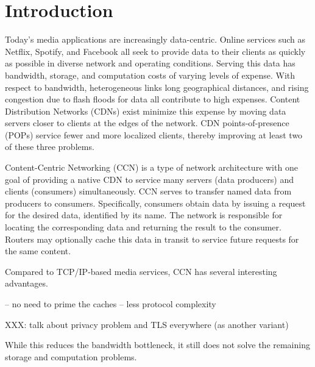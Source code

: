 \section{Introduction}
Today's media applications are increasingly data-centric. Online services
such as Netflix, Spotify, and Facebook all seek to provide data to their
clients as quickly as possible in diverse network and operating conditions. 
Serving this data has bandwidth, storage, and computation costs of varying
levels of expense. With respect to bandwidth, heterogeneous links long geographical 
distances, and rising congestion due to flash floods for data all contribute to
high expenses. Content Distribution Networks (CDNs) exist minimize this expense 
by moving data servers closer to clients at the edges
of the network. CDN points-of-presence (POPs) service fewer and more localized clients,
thereby improving at least two of these three problems. 

Content-Centric Networking (CCN) is a type of network architecture with one goal
of providing a native CDN to service many servers (data producers) and clients (consumers)
simultaneously. CCN serves to transfer named data from producers to consumers. 
Specifically, consumers obtain data by issuing a request for the desired data,
identified by its name. The network is responsible for locating the corresponding
data and returning the result to the consumer. Routers may optionally cache
this data in transit to service future requests for the same content. 

Compared to TCP/IP-based media services, CCN has several interesting advantages. 

-- no need to prime the caches
-- less protocol complexity 

XXX: talk about privacy problem and TLS everywhere (as another variant)

While this reduces the bandwidth bottleneck, it still does not solve the remaining
storage and computation problems. 

